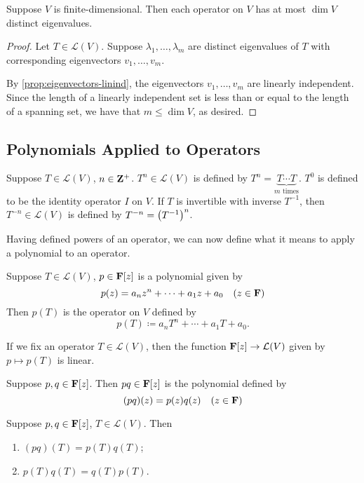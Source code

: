 \begin{corollary}
Suppose $V$ is finite-dimensional. Then each operator on $V$ has at most $\dim V$ distinct eigenvalues.
\end{corollary}

\begin{proof}
Let $T\in\mathcal{L}(V)$. Suppose $\lambda_1,\dots,\lambda_m$ are distinct eigenvalues of $T$ with corresponding eigenvectors $v_1,\dots,v_m$.

By \cref{prop:eigenvectors-linind}, the eigenvectors $v_1,\dots,v_m$ are linearly independent. Since the length of a linearly independent set is less than or equal to the length of a spanning set, we have that $m\le\dim V$, as desired.
\end{proof}

\subsection{Polynomials Applied to Operators}
\begin{notation}
Suppose $T\in\mathcal{L}(V)$, $n\in\mathbf Z^+$. $T^n\in\mathcal{L}(V)$ is defined by $T^n=\underbrace{T\cdots T}_\text{$m$ times}$. $T^0$ is defined to be the identity operator $I$ on $V$. If $T$ is invertible with inverse $T^{-1}$, then $T^{-n}\in\mathcal{L}(V)$ is defined by $T^{-n}=\left(T^{-1}\right)^n$.
\end{notation}

Having defined powers of an operator, we can now define what it means to apply a polynomial to an operator.

\begin{definition}
Suppose $T\in\mathcal{L}(V)$, $p\in\mathbf F[z]$ is a polynomial given by
\[p(z)=a_nz^n+\cdots+a_1z+a_0\quad(z\in\mathbf F)\]
Then $p(T)$ is the operator on $V$ defined by
\[p(T)\coloneqq a_nT^n+\cdots+a_1T+a_0.\]
\end{definition}

\begin{remark}
If we fix an operator $T\in\mathcal{L}(V)$, then the function $\mathbf F[z]\to\mathcal{L}(V)$ given by $p\mapsto p(T)$ is linear.
\end{remark}

\begin{definition}
Suppose $p,q\in\mathbf F[z]$. Then $pq\in\mathbf F[z]$ is the polynomial defined by
\[(pq)(z)=p(z)q(z)\quad(z\in\mathbf F)\]
\end{definition}

\begin{proposition}
Suppose $p,q\in\mathbf F[z]$, $T\in\mathcal{L}(V)$. Then
\begin{enumerate}[label=(\roman*)]
\item $(pq)(T)=p(T)q(T)$;
\item $p(T)q(T)=q(T)p(T)$.
\end{enumerate}
\end{proposition}

